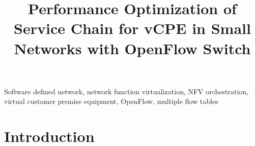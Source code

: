 \documentclass[conference]{IEEEtran}
\begin{document}
\title{Performance Optimization of Service Chain for vCPE in Small Networks with OpenFlow Switch}

\author{

}

\maketitle

\begin{abstract}
\end{abstract}

\begin{IEEEkeywords}
Software defined network, network function virtualization, NFV orchestration, virtual customer premise equipment, OpenFlow, multiple flow tables
\end{IEEEkeywords}

\IEEEpeerreviewmaketitle{}


\section{Introduction}
\end{document}
